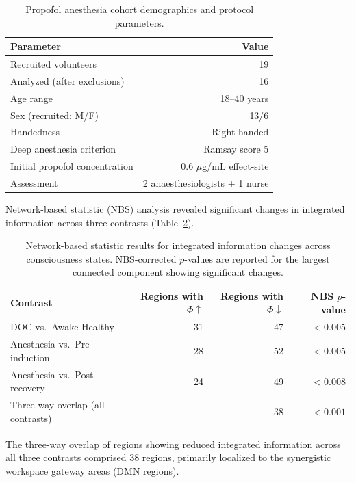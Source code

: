 \documentclass[11pt]{article}
\begin{document}
\begin{table}[H]
\centering
\caption{Propofol anesthesia cohort demographics and protocol parameters.}
\label{tab:anesthesia}
\begin{tabular}{lr}
\toprule
\textbf{Parameter} & \textbf{Value} \\
\midrule
Recruited volunteers & 19 \\
Analyzed (after exclusions) & 16 \\
Age range & 18--40 years \\
Sex (recruited: M/F) & 13/6 \\
Handedness & Right-handed \\
Deep anesthesia criterion & Ramsay score 5 \\
Initial propofol concentration & 0.6 $\mu$g/mL effect-site \\
Assessment & 2 anaesthesiologists + 1 nurse \\
\bottomrule
\end{tabular}
\end{table}

Network-based statistic (NBS) analysis \citep{zalesky2010network} revealed significant changes in integrated information across three contrasts (Table~\ref{tab:nbs}).

\begin{table}[H]
\centering
\caption{Network-based statistic results for integrated information changes across consciousness states. NBS-corrected $p$-values are reported for the largest connected component showing significant changes.}
\label{tab:nbs}
\begin{tabular}{lrrr}
\toprule
\textbf{Contrast} & \textbf{Regions with $\Phi\uparrow$} & \textbf{Regions with $\Phi\downarrow$} & \textbf{NBS $p$-value} \\
\midrule
DOC vs.\ Awake Healthy & 31 & 47 & $<0.005$ \\
Anesthesia vs.\ Pre-induction & 28 & 52 & $<0.005$ \\
Anesthesia vs.\ Post-recovery & 24 & 49 & $<0.008$ \\
\midrule
Three-way overlap (all contrasts) & -- & 38 & $<0.001$ \\
\bottomrule
\end{tabular}
\end{table}

The three-way overlap of regions showing reduced integrated information across all three contrasts comprised 38 regions, primarily localized to the synergistic workspace gateway areas (DMN regions).
\end{document}
